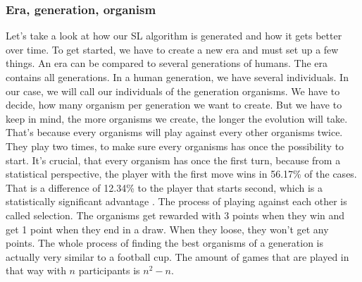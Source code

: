 \subsubsection{Era, generation, organism}
Let's take a look at how our \ac{SL} algorithm is generated and how it gets better over time.
To get started, we have to create a new \ac{era} and must set up a few things. An era can be compared to several \acp{generation} of humans. 
The era contains all generations. In a human generation, we have several individuals. In our case, we will call our individuals of the generation \acp{organism}. We have to decide, how many organism per generation we want to create. But we have to keep in mind, the more organisms we create, the longer the evolution will take. That's because every organisms will play against every other organisms twice. They play two times, to make sure every organisms has once the possibility to start. It's crucial, that every organism has once the first turn, because from a statistical perspective, the player with the first move wins in 56.17\% of the cases. That is a difference of 12.34\% to the player that starts second, which is a statistically significant advantage \cite[p.~5]{web:tsurel2013}.
The process of playing against each other is called selection. The organisms get rewarded with 3 points when they win and get 1 point when they end in a draw. When they loose, they won't get any points. The whole process of finding the best organisms of a generation is actually very similar to a football cup.
The amount of games that are played in that way with $n$ participants is $n^2-n$.\\

